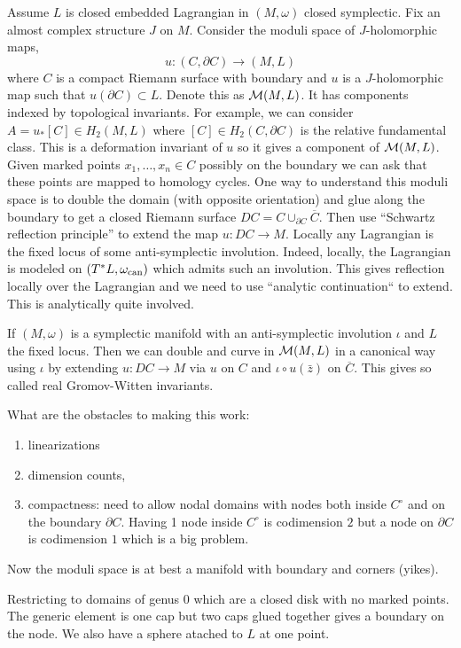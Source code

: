 \documentclass[12pt]{article}
\begin{document}
Assume $L$ is closed embedded Lagrangian in $(M, \omega)$ closed symplectic. Fix an almost complex structure $J$ on $M$. Consider the moduli space of $J$-holomorphic maps,
\[ u : (C, \partial C) \to (M, L) \]
where $C$ is a compact Riemann surface with boundary and $u$ is a $J$-holomorphic map such that $u(\partial C) \subset L$. Denote this as $\mathcal{M}(M, L)$. It has components indexed by topological invariants. For example, we can consider $A = u_* [C] \in H_2(M, L)$ where $[C] \in H_2(C, \partial C)$ is the relative fundamental class. This is a deformation invariant of $u$ so it gives a component of $\mathcal{M}(M, L)$. Given marked points $x_1, \dots, x_n \in C$ possibly on the boundary we can ask that these points are mapped to homology cycles. One way to understand this moduli space is to double the domain (with opposite orientation) and glue along the boundary to get a closed Riemann surface $DC = C \cup_{\partial C} \overline{C}$. Then use ``Schwartz reflection principle'' to extend the map $u : DC \to M$. Locally any Lagrangian is the fixed locus of some anti-symplectic involution. Indeed, locally, the Lagrangian is modeled on $(T^* L, \omega_{\text{can}})$ which admits such an involution. This gives reflection locally over the Lagrangian and we need to use ``analytic continuation`` to extend. This is analytically quite involved. 

\begin{example}
If $(M, \omega)$ is a symplectic manifold with an anti-symplectic involution $\iota$ and $L$ the fixed locus. Then we can double and curve in $\mathcal{M}(M, L)$ in a canonical way using $\iota$ by extending $u : DC \to M$ via $u$ on $C$ and $\iota \circ u(\bar{z})$ on $\overline{C}$. This gives so called real Gromov-Witten invariants. 
\end{example}

What are the obstacles to making this work:

\begin{enumerate}
\item linearizations
\item dimension counts,
\item compactness: need to allow nodal domains with nodes both inside $C^\circ$ and on the boundary $\partial C$. Having 1 node inside $C^\circ$ is codimension $2$ but a node on $\partial C$ is codimension $1$ which is a big problem.
\end{enumerate}

Now the moduli space is at best a manifold with boundary and corners (yikes). 

\begin{example}
Restricting to domains of genus $0$ which are a closed disk with no marked points. The generic element is one cap but two caps glued together gives a boundary on the node. We also have a sphere atached to $L$ at one point. 
\end{example}
\end{document}
